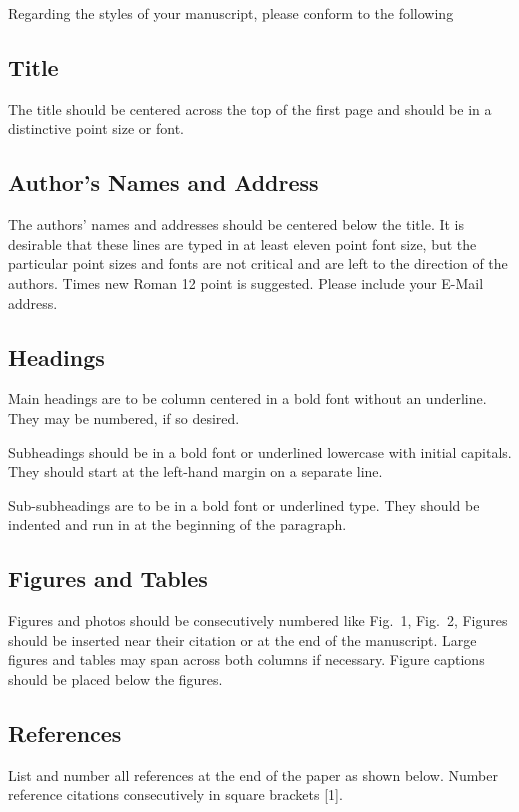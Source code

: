 \documentclass[a4paper]{article}
\begin{document}
Regarding the styles of your manuscript, please conform to the following 

\subsection{Title}
The title should be centered across the top of the first page and should 
be in a distinctive point size or font.

\subsection{Author's Names and Address}
The authors' names and addresses should be centered below the title.
It is desirable that these lines are typed in at least eleven point font size,
but the particular point sizes and fonts are not critical and are left to the
direction of the authors.
Times new Roman 12 point is suggested.
Please include your E-Mail address. 

\subsection{Headings}
Main headings are to be column centered in a bold font without an underline.
They may be numbered, if so desired. 

Subheadings should be in a bold font or underlined lowercase with initial
capitals.
They should start at the left-hand margin on a separate line.

Sub-subheadings are to be in a bold font or underlined type.
They should be indented and run in at the beginning of the paragraph.

\subsection{Figures and Tables} 
Figures and photos should be consecutively numbered like Fig{.}~1, Fig{.}~2,
Figures should be inserted near their citation or at the end of the manuscript.
Large figures and tables may span across both columns if necessary.
Figure captions should be placed below the figures. 

\subsection{References}
List and number all references at the end of the paper as shown below.
Number reference citations consecutively in square brackets [1].
\end{document}
